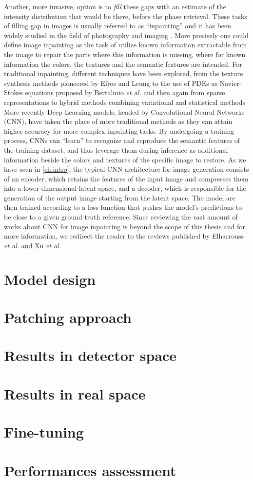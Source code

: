 Another, more invasive, option is to \textit{fill} these gaps with an estimate of the intensity distribution that
would be there, before the phase retrieval. These tasks of filling gap in images is usually referred to as ``inpainting'' 
and it has been widely studied in the field of photography and imaging \cite{Elharrouss_2019,reviewInpainting2021}. More 
precisely one could define image inpainting as the task of utilize known information extractable from the image to repair
the parts where this information is missing, where for known information the colors, the textures and the semantic features
are intended. For traditional inpainting, different techniques have been explored, from the texture synthesis methods pioneered by Efros and 
Leung \cite{Efros1999} to the use of PDEs as Navier-Stokes equations proposed by Bertalmio \textit{et al.} \cite{BertalmioNavierStokes}
and then again from sparse representations \cite{Mairal_sparse} to hybrid methods combining variational and statistical methods \cite{CedricAllene}
More recently Deep Learning models, headed by Convolutional Neural Networks (CNN), have taken the place of more traditional 
methods as they can attain higher accuracy for more complex inpainting tasks. By undergoing a  
training process, CNNs can ``learn'' to recognize and reproduce the semantic features of the training dataset, and thus
leverage them during inference as additional information beside the colors and textures of the specific image to restore. 
As we have seen in \ref{ch:intro}, the typical CNN architecture for image generation consists of an encoder, which
retains the features of the input image and compresses them into a lower dimensional latent space, and a decoder, which
is responsible for the generation of the output image starting from the latent space. The model are then trained according 
to a loss function that pushes the model's predictions to be close to a given ground truth reference. 
Since reviewing the vast amount of works about CNN for image inpainting is beyond the scope of this thesis and for more 
information, we redirect the reader to the reviews published by Elharrouss \textit{et al.} and Xu \textit{et al.} \cite{reviewInpainting2021,reviewInpaintingDL2023}.






\section{Model design}\label{sec:model}
\section{Patching approach}\label{sec:patching}
\section{Results in detector space}\label{sec:res_rec}
\section{Results in real space}\label{sec:res_real}
\section{Fine-tuning}\label{sec:finetuning}
\section{Performances assessment}\label{sec:performances}
